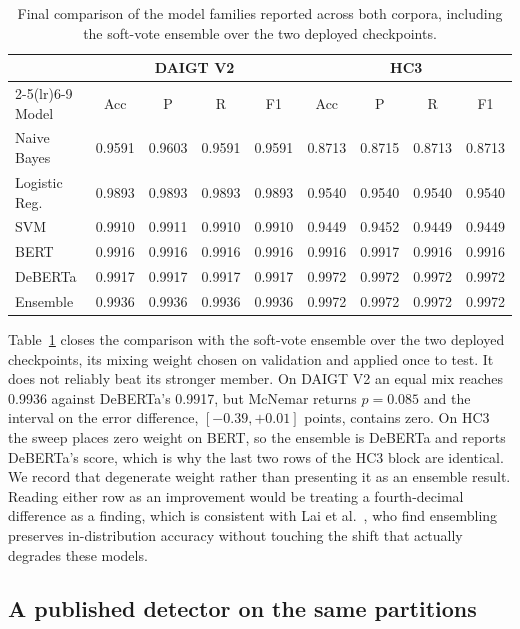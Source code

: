 \documentclass[conference,a4paper]{IEEEtran}
\begin{document}
\begin{table}[!ht]
\centering
\caption{Final comparison of the model families reported across both corpora, including the soft-vote ensemble over the two deployed checkpoints.}
\label{tab:final}
\scriptsize
\setlength{\tabcolsep}{2.2pt}
\begin{tabular}{@{}lcccccccc@{}}
\toprule
& \multicolumn{4}{c}{DAIGT V2} & \multicolumn{4}{c}{HC3} \\
\cmidrule(lr){2-5}\cmidrule(lr){6-9}
Model & Acc & P & R & F1 & Acc & P & R & F1 \\
\midrule
Naive Bayes & 0.9591 & 0.9603 & 0.9591 & 0.9591 & 0.8713 & 0.8715 & 0.8713 & 0.8713 \\
Logistic Reg. & 0.9893 & 0.9893 & 0.9893 & 0.9893 & 0.9540 & 0.9540 & 0.9540 & 0.9540 \\
SVM & 0.9910 & 0.9911 & 0.9910 & 0.9910 & 0.9449 & 0.9452 & 0.9449 & 0.9449 \\
BERT & 0.9916 & 0.9916 & 0.9916 & 0.9916 & 0.9916 & 0.9917 & 0.9916 & 0.9916 \\
DeBERTa & 0.9917 & 0.9917 & 0.9917 & 0.9917 & 0.9972 & 0.9972 & 0.9972 & 0.9972 \\
Ensemble & 0.9936 & 0.9936 & 0.9936 & 0.9936 & 0.9972 & 0.9972 & 0.9972 & 0.9972 \\
\bottomrule
\end{tabular}
\end{table}

Table~\ref{tab:final} closes the comparison with the soft-vote ensemble over the two deployed checkpoints, its mixing weight chosen on validation and applied once to test. It does not reliably beat its stronger member. On DAIGT V2 an equal mix reaches 0.9936 against DeBERTa's 0.9917, but McNemar returns $p=0.085$ and the interval on the error difference, $[-0.39, +0.01]$ points, contains zero. On HC3 the sweep places zero weight on BERT, so the ensemble is DeBERTa and reports DeBERTa's score, which is why the last two rows of the HC3 block are identical. We record that degenerate weight rather than presenting it as an ensemble result. Reading either row as an improvement would be treating a fourth-decimal difference as a finding, which is consistent with Lai et al.~\cite{Lai2024adaptive}, who find ensembling preserves in-distribution accuracy without touching the shift that actually degrades these models.

\subsection{A published detector on the same partitions}
\label{sec:published}
\end{document}
